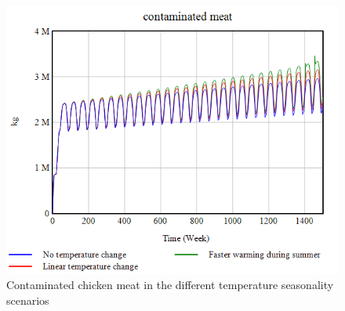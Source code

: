 \begin{figure}[h!]
\begin{minipage}{0.45\textwidth}
        \includegraphics[width=1\textwidth]{images/sensitivity/Seasonal temperature contaminated meat.png} %
        \caption{Contaminated chicken meat in the different temperature seasonality scenarios}
        \label{fig:season_meat}
    \end{minipage}
\end{figure}

